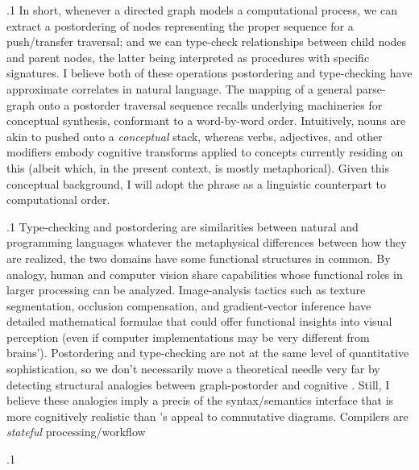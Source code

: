 \documentclass[11pt, twocolumn]{article}
\begin{document}
\p.1{%
\:\+In short, whenever a directed graph models a computational
process, we can extract a postordering of nodes
representing the proper sequence for a push/transfer traversal;
and we can type-check relationships between
child nodes and parent nodes, the latter being interpreted
as procedures with specific signatures. \> I believe
both of these operations \mdash{} postordering and type-checking
\mdash{} have approximate correlates in natural 
language. \> The mapping of a general parse-graph onto
a postorder traversal sequence recalls
underlying machineries for conceptual synthesis,
conformant to a word-by-word  order. \> Intuitively, 
nouns are akin to
 pushed onto a \textit{conceptual} stack,
whereas verbs, adjectives, and other modifiers
embody cognitive transforms applied to concepts
currently residing on this 
(albeit which, in the present context, is mostly 
metaphorical). \> Given this conceptual background, I will adopt the
phrase  as a linguistic
counterpart to computational  
order.\<\;
} %

\p.1{%
\:\+Type-checking and postordering are 
similarities between natural and programming languages
\mdash{} whatever the metaphysical differences between how
they are realized, the two domains have some
functional structures in common. \> By analogy,
human and computer vision share capabilities
whose functional roles in larger processing 
can be analyzed. \> Image-analysis tactics such as texture
segmentation, occlusion compensation, and gradient-vector inference
have detailed mathematical formulae that could offer functional insights into
visual perception (even if computer implementations may
be very different from brains'). \> Postordering and type-checking are
not at the same level of quantitative sophistication,
so we don't necessarily move a theoretical needle very far
by detecting structural analogies between graph-postorder
and cognitive . \> Still,
I believe these analogies imply a precis of the
syntax/semantics interface that is more cognitively realistic
than \Boltetal{}'s appeal to commutative diagrams. \> Compilers
are \textit{stateful} processing/workflow \textcolor{white}{platforms,
more than term-reduce artefacts.}
} %

\pa.1{%
\upAdj{1.8em}
\noindent{}\<\;\upAdj{1em}
} %
\end{document}

